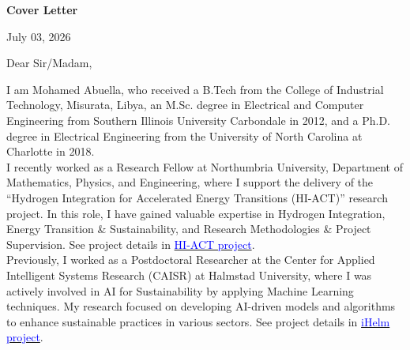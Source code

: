 \documentclass[11pt,letterpaper,sans]{moderncv}
\begin{document}
\makecvtitle
\vspace{-2ex}

\vspace{1.5ex}
\begin{center}
{\color{myred}\bfseries\Large Cover Letter}
\end{center}
\vspace{0.5ex}

\hfill{July 03, 2026}

\vspace{1ex}

Dear Sir/Madam,

\vspace{3ex}

\hspace{2em}
I am Mohamed Abuella, who received a B.Tech from the College of Industrial Technology, Misurata, Libya, an M.Sc. degree in Electrical and Computer Engineering from Southern Illinois University Carbondale in 2012, and a Ph.D. degree in Electrical Engineering from the University of North Carolina at Charlotte in 2018.
\\

I recently worked as a Research Fellow at Northumbria University, Department of Mathematics, Physics, and Engineering, where I support the delivery of the “Hydrogen Integration for Accelerated Energy Transitions (HI-ACT)” research project.
In this role, I have gained valuable expertise in Hydrogen Integration, Energy Transition \& Sustainability, and Research Methodologies \& Project Supervision.
See project details in
\href{https://mohamedabuella.github.io/blog/2026/05/07/HI_ACT_Project_Hydrogen_Integration_for_Accelerated_Energy_Transition_in_GB}
{\textcolor{blue}{HI-ACT project}}.
\\

Previously, I worked as a Postdoctoral Researcher at the Center for Applied Intelligent Systems Research (CAISR) at Halmstad University, where I was actively involved in AI for Sustainability by applying Machine Learning techniques.
My research focused on developing AI-driven models and algorithms to enhance sustainable practices in various sectors.
See project details in
\href{https://mohamedabuella.github.io/blog/2024/03/24/iHelm_Project_for_Improving_Energy_Efficiency_in_Short_Sea_Shipping}
{\textcolor{blue}{iHelm project}}.
\\
\end{document}

